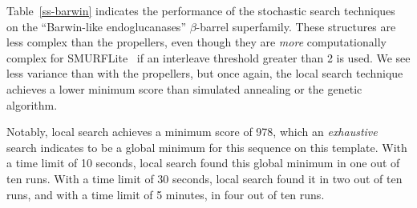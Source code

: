 \documentclass[blockstyle,times,preprint]{sigplanconf}
\begin{document}
Table~\ref{ss-barwin} indicates the performance of the stochastic
search techniques on the ``Barwin-like endoglucanases'' $\beta$-barrel 
superfamily.
These structures are less complex than the propellers, even though they are
\emph{more} computationally complex for SMURFLite~\cite{Daniels:2012dg} if an 
interleave threshold greater than 2 is used. 
We see less variance than with the propellers, but once again, the local search
technique achieves a lower minimum score than simulated annealing or the genetic
algorithm.

Notably, local search achieves a minimum score of 978, which an 
\emph{exhaustive} search indicates to be a global minimum for this sequence on
this template.
With a time limit of 10 seconds, local search found this global minimum in one 
out of ten runs. 
With a time limit of 30 seconds, local search found it in two out of
ten runs, and with a time limit of 5 minutes, in four out of ten runs.

\end{document}
